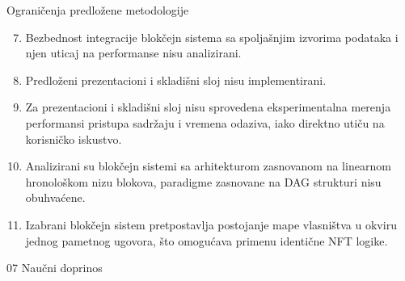 \begin{frame}{Ograničenja predložene metodologije}

\begin{enumerate}
\setcounter{enumi}{6}
\item Bezbednost integracije blokčejn sistema sa spoljašnjim izvorima podataka i njen uticaj na performanse nisu analizirani.
\item Predloženi prezentacioni i skladišni sloj nisu implementirani.
\item Za prezentacioni i skladišni sloj nisu sprovedena eksperimentalna merenja performansi pristupa sadržaju i vremena odaziva, iako direktno utiču na korisničko iskustvo.
\item Analizirani su blokčejn sistemi sa arhitekturom zasnovanom na linearnom hronološkom nizu blokova, paradigme zasnovane na DAG strukturi nisu obuhvaćene.
\item Izabrani blokčejn sistem pretpostavlja postojanje mape vlasništva u okviru jednog pametnog ugovora, što omogućava primenu identične NFT logike.
\end{enumerate}

\end{frame}


\sectionframe
    {07}
    {Naučni doprinos}
    {}


